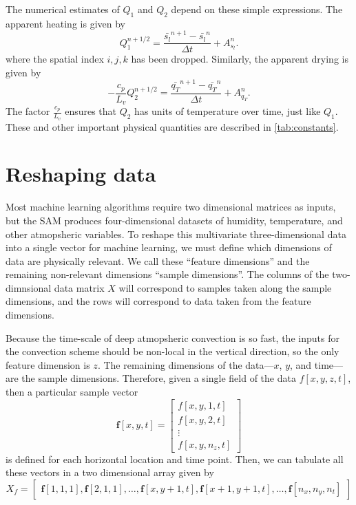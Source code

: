 \documentclass{report}
\begin{document}
The numerical estimates of $Q_1$ and $Q_2$ depend on these simple expressions.
The apparent heating is given by
\begin{equation}
  \label{eq:q1-num}
  Q_1^{n+1/2} = \frac{\bar{s_l}^{n+1} - \bar{s_l}^{n} }{\Delta t}
            +  A^{n}_{s_l} .
\end{equation}
where the spatial index $i,j,k$ has been dropped. Similarly, the apparent
drying is given by
\begin{equation}
  \label{eq:q2-num}
  -\frac{c_p}{L_v} Q_2^{n+1/2} = \frac{\bar{q_T}^{n+1} - \bar{q_T}^{n} }{\Delta t}
            +  A^{n}_{q_T} .
\end{equation}
The factor $\frac{c_p}{L_v}$ ensures that $Q_2$ has units of temperature over
time, just like $Q_1$. These and other important physical quantities are
described in \autoref{tab:constants}.

\section{Reshaping data}

Most machine learning algorithms require two dimensional matrices as inputs, but
the SAM produces four-dimensional datasets of humidity, temperature, and other
atmopsheric variables. 
To reshape this multivariate three-dimensional data into a single vector for
machine learning, we must define which dimensions of data are physically
relevant. 
We call these ``feature dimensions'' and the remaining non-relevant dimensions
``sample dimensions''. The columns of the two-dimnsional data matrix $X$ will
correspond to samples taken along the sample dimensions, and the rows will
correspond to data taken from the feature dimensions. 

Because the time-scale of deep atmopsheric convection is so fast, the inputs for
the convection scheme should be non-local in the vertical direction, so the only
feature dimension is $z$. 
The remaining dimensions of the data---$x$, $y$, and time---are the sample
dimensions. 
Therefore, given a single field of the data $f[x,y,z,t]$, then a particular sample vector
\[
  \mathbf{f}[x,y,t] =
    \begin{bmatrix}
      f[x,y,1,t] \\
      f[x,y,2,t] \\
      \vdots\\
      f[x,y,n_z,t]
    \end{bmatrix}
\]
is defined for each horizontal location and time point. Then, we can tabulate
all these vectors in a two dimensional array given by
\newcommand{\fb}{\mathbf{f}}
\[
  X_f = 
  \begin{bmatrix}
    \fb[1,1,1], \fb[2,1,1], \ldots,\fb[x,y+1,t], \fb[x+1,y+1,t],\ldots,\fb[n_x, n_y,
    n_t]
  \end{bmatrix}
\]
\end{document}
